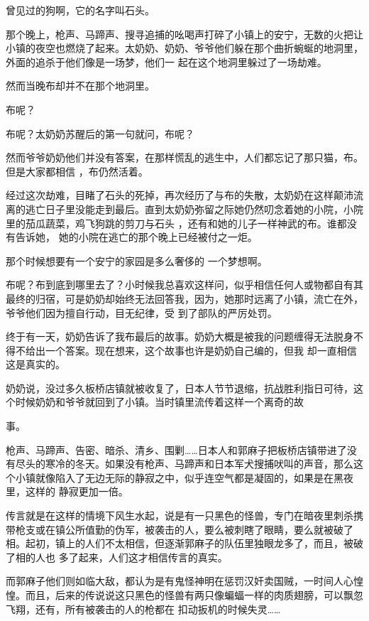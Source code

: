\documentclass{article}
\begin{document}
\newpage
曾见过的狗啊，它的名字叫石头。 

那个晚上，枪声、马蹄声、搜寻追捕的吆喝声打碎了小镇上的安宁，无数的火把让小镇的夜空也燃烧了起来。太奶奶、奶奶、爷爷他们躲在那个曲折蜿蜒的地洞里，外面的追杀于他们像是一场梦，他们一
起在这个地洞里躲过了一场劫难。 


然而当晚布却并不在那个地洞里。 


布呢？ 


布呢？太奶奶苏醒后的第一句就问，布呢？ 

然而爷爷奶奶他们并没有答案，在那样慌乱的逃生中，人们都忘记了那只猫，布。但是大家都相信
，布仍然活着。 

经过这次劫难，目睹了石头的死掉，再次经历了与布的失散，太奶奶在这样颠沛流离的逃亡日子里没能走到最后。直到太奶奶弥留之际她仍然叨念着她的小院，小院里的茄瓜蔬菜，鸡飞狗跳的剪刀与石头
\newpage
，还有和她的儿子一样神武的布。谁都没有告诉她，
她的小院在逃亡的那个晚上已经被付之一炬。 

那个时候想要有一个安宁的家园是多么奢侈的
一个梦想啊。 

布呢？布到底到哪里去了？小时候我总喜欢这样问，似乎相信任何人或物都自有其最终的归宿，可是奶奶却始终无法回答我，因为，她那时远离了小镇，流亡在外，爷爷他们因为擅自行动，目无纪律，受
到了部队的严厉处罚。 

终于有一天，奶奶告诉了我布最后的故事。奶奶大概是被我的问题缠得无法脱身不得不给出一个答案。现在想来，这个故事也许是奶奶自己编的，但我
却一直相信这是真实的。 

奶奶说，没过多久板桥店镇就被收复了，日本人节节退缩，抗战胜利指日可待，这个时候奶奶和爷爷就回到了小镇。当时镇里流传着这样一个离奇的故

\newpage
事。 

枪声、马蹄声、告密、暗杀、清乡、围剿……日本人和郭麻子把板桥店镇带进了没有尽头的寒冷的冬天。如果没有枪声、马蹄声和日本军犬搜捕吠叫的声音，那么这个小镇就像陷入了无边无际的静寂之中，似乎连空气都是凝固的，如果是在黑夜里，这样的
静寂更加一倍。 

传言就是在这样的情境下风生水起，说是有一只黑色的怪兽，专门在暗夜里刺杀携带枪支或在镇公所值勤的伪军，被袭击的人，要么被刺瞎了眼睛，要么就被破了相。起初，镇上的人们不太相信，但逐渐郭麻子的队伍里独眼龙多了，而且，被破了相的人也
多了起来，人们这才相信传言的真实。 

而郭麻子他们则如临大敌，都认为是有鬼怪神明在惩罚汉奸卖国贼，一时间人心惶惶。而且，后来的传说说这只黑色的怪兽有两只像蝙蝠一样的肉质翅膀，可以飘忽飞翔，还有，所有被袭击的人的枪都在
扣动扳机的时候失灵…… 

\newpage
\end{document}
